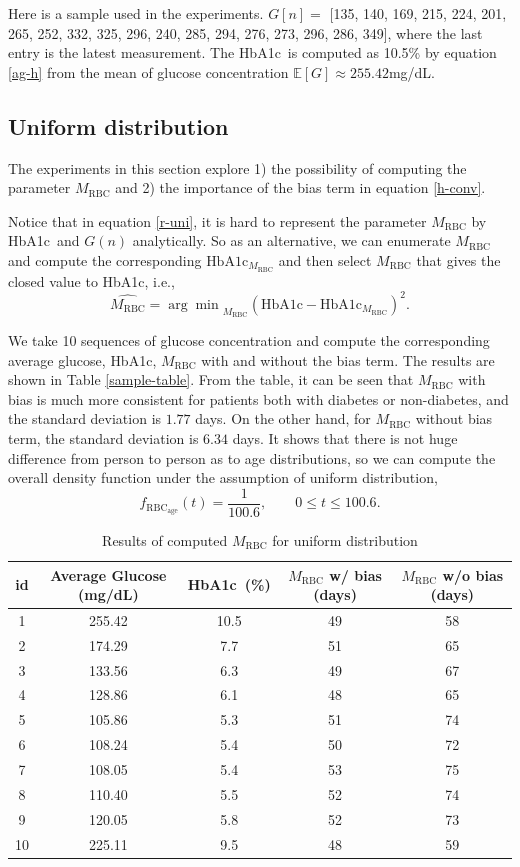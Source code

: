 \documentclass{article}
\newcommand{\hba}{\textrm{HbA1c}}
\newcommand{\f}{f_{\mathrm{RBC}_{\mathrm{age}}}}
\newcommand{\mean}{M_\mathrm{RBC}}
\newcommand\E{\mathbb{E}}
\begin{document}
Here is a sample used in the experiments. $G[n] = $ [135, 140, 169, 215, 224, 201, 265, 252, 332, 325, 296, 240, 285, 294, 276, 273, 296, 286, 349], where the last entry is the latest measurement. The \hba\ is computed as 10.5\% by equation \ref{ag-h} from the mean of glucose concentration $\E[G]\approx255.42$mg/dL.

\subsection{Uniform distribution}
The experiments in this section explore 1) the possibility of computing the parameter $\mean$ and 2) the importance of the bias term in equation \ref{h-conv}.

Notice that in equation \ref{r-uni}, it is hard to represent the parameter $\mean$ by \hba\ and $G(n)$ analytically. So as an alternative, we can enumerate $\mean$ and compute the corresponding $\hba_{\mean}$ and then select $\mean$ that gives the closed value to \hba, i.e., 
\[\hat{\mean} = {\arg\min}_{\mean}\left(\hba - \hba_{\mean}\right)^2.\]

We take 10 sequences of glucose concentration and compute the corresponding average glucose, \hba, $\mean$ with and without the bias term. The results are shown in Table \ref{sample-table}. From the table, it can be seen that $\mean$ with bias is much more consistent for patients both with diabetes or non-diabetes, and the standard deviation is $1.77$ days. On the other hand, for $\mean$ without bias term, the standard deviation is $6.34$ days.
It shows that there is not huge difference from person to person as to age distributions, so we can compute the overall density function under the assumption of uniform distribution,
\[\f(t) = \frac{1}{100.6},\quad\quad0\leq t\leq 100.6.\]

\begin{table}[t]
  \caption{Results of computed $\mean$ for uniform distribution}
  \label{sample-table1}
  \centering
  \begin{tabular}{ccccc}
    \toprule
    id     &   Average Glucose (mg/dL)   & \hba\ (\%)     & $\mean$ w/ bias (days) & $\mean$ w/o bias (days) \\
    \midrule
    1 & 255.42  & 10.5 & 49 & 58   \\
    2 & 174.29  &  7.7  & 51 & 65   \\
    3 & 133.56  &  6.3  & 49 & 67   \\
    4 & 128.86 & 6.1 & 48 & 65   \\
    5 & 105.86 & 5.3 & 51 & 74   \\
    6 & 108.24 & 5.4 & 50 & 72   \\
    7 & 108.05 & 5.4 & 53 & 75   \\
    8 & 110.40 & 5.5 & 52 & 74   \\
    9 & 120.05 & 5.8 & 52 & 73   \\
    10 & 225.11 & 9.5 & 48 & 59   \\
    \bottomrule
  \end{tabular}
\end{table}
\end{document}
